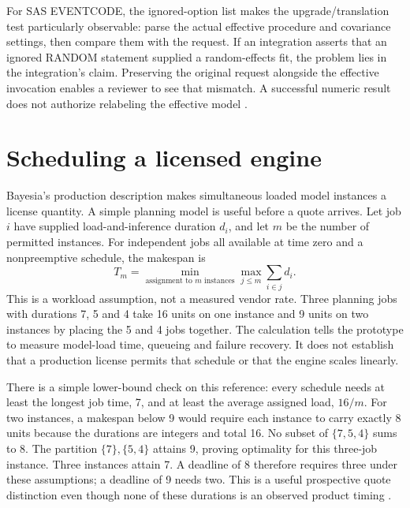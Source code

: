 For SAS EVENTCODE, the ignored-option list makes the upgrade/translation test
particularly observable: parse the actual effective procedure and covariance
settings, then compare them with the request. If an integration asserts that
an ignored RANDOM statement supplied a random-effects fit, the problem lies
in the integration's claim. Preserving the original request alongside the
effective invocation enables a reviewer to see that mismatch. A successful
numeric result does not authorize relabeling the effective model
\citep{exec14_survival_sas}.

\section{Scheduling a licensed engine}
\label{exec17:s8-scheduling}

Bayesia's production description makes simultaneous loaded model instances a
license quantity. A simple planning model is useful before a quote arrives.
Let job $i$ have supplied load-and-inference duration $d_i$, and let $m$ be the
number of permitted instances. For independent jobs all available at time zero and a nonpreemptive
schedule, the makespan is
\begin{equation}
 T_m=\min_{\text{assignment to }m\text{ instances}}
       \max_{j\leq m}\sum_{i\in j}d_i.
 \label{exec17:s8-makespan}
\end{equation}
This is a workload assumption, not a measured vendor rate. Three planning jobs
with durations 7, 5 and 4 take 16 units on one instance and 9 units on two
instances by placing the 5 and 4 jobs together. The calculation tells the
prototype to measure model-load time, queueing and failure recovery. It does
not establish that a production license permits that schedule or that the
engine scales linearly.

There is a simple lower-bound check on this reference: every schedule needs
at least the longest job time, 7, and at least the average assigned load,
$16/m$. For two instances, a makespan below 9 would require each instance to
carry exactly 8 units because the durations are integers and total 16. No
subset of $\{7,5,4\}$ sums to 8. The partition $\{7\},\{5,4\}$ attains 9,
proving optimality for this three-job instance. Three instances attain 7.
A deadline of 8 therefore requires three under these assumptions; a deadline
of 9 needs two. This is a useful prospective quote distinction even though
none of these durations is an observed product timing
\citep{exec17_s8_examples}.

